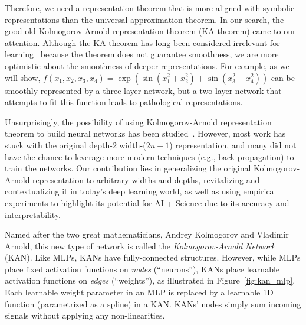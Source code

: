 \documentclass[12pt]{caltech_thesis}
\numberwithin{equation}{section}
\begin{document}
Therefore, we need a representation theorem that is more aligned with symbolic representations than the universal approximation theorem. In our search, the good old Kolmogorov-Arnold representation theorem (KA theorem) came to our attention. Although the KA theorem has long been considered irrelevant for learning~\cite{girosi1989representation} because the theorem does not guarantee smoothness, we are more optimistic about the smoothness of deeper representations. For example, as we will show, $f(x_1,x_2,x_3,x_4)={\exp}({\sin}(x_1^2+x_2^2)+{\sin}(x_3^2+x_4^2))$ can be smoothly represented by a three-layer network, but a two-layer network that attempts to fit this function leads to pathological representations.

Unsurprisingly, the possibility of using Kolmogorov-Arnold representation theorem to build neural networks has been studied~\cite{sprecher2002space,koppen2002training,lin1993realization,lai2021kolmogorov,leni2013kolmogorov,fakhoury2022exsplinet,montanelli2020error}. However, most work has stuck with the original depth-2 width-($2n+1$) representation, and many did not have the chance to leverage more modern techniques (e.g., back propagation) to train the networks. Our contribution lies in generalizing the original Kolmogorov-Arnold representation to arbitrary widths and depths, revitalizing and  contextualizing it in today's deep learning world, as well as using empirical experiments to highlight its potential for AI + Science due to its accuracy and interpretability.

Named after the two great mathematicians, Andrey Kolmogorov and Vladimir Arnold, this new type of network is called the \textit{Kolmogorov-Arnold Network} (KAN). %
Like MLPs, KANs have fully-connected structures. However, while MLPs place fixed activation functions on \textit{nodes} (``neurons''), KANs place learnable activation functions on \textit{edges} (``weights''), as illustrated in Figure~\ref{fig:kan_mlp}.  %
Each learnable weight parameter in an MLP is replaced by a learnable 1D function (parametrized as a spline) in a KAN. KANs' nodes simply sum incoming signals without applying any non-linearities. 
\end{document}

